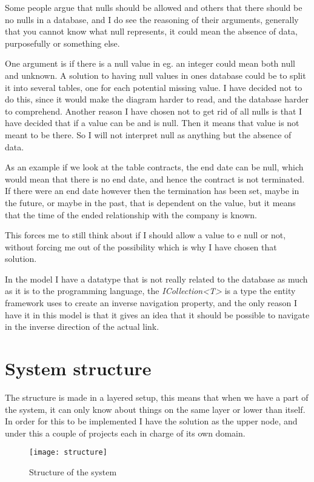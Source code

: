 Some people argue that nulls should be allowed and others that there should be no nulls in a database\cite{stackexchange:db:nullfields}, and I do see the reasoning of their arguments, generally that you cannot know what null represents, it could mean the absence of data, purposefully or something else.

One argument is if there is a null value in eg. an integer could mean both null and unknown. A solution to having null values in ones database could be to split it into several tables, one for each potential missing value. I have decided not to do this, since it would make the diagram harder to read, and the database harder to comprehend. Another reason I have chosen not to get rid of all nulls is that I have decided that if a value can be and is null. Then it means that value is not meant to be there. So I will not interpret null as anything but the absence of data.

As an example if we look at the table contracts, the end date can be null, which would mean that there is no end date, and hence the contract is not terminated. If there were an end date however then the termination has been set, maybe in the future, or maybe in the past, that is dependent on the value, but it means that the time of the ended relationship with the company is known.

This forces me to still think about if I should allow a value to e null or not, without forcing me out of the possibility which is why I have chosen that solution.

In the model I have a datatype that is not really related to the database as much as it is to the programming language, the \textit{ICollection<T>} is a type the entity framework uses to create an inverse navigation property, and the only reason I have it in this model is that it gives an idea that it should be possible to navigate in the inverse direction of the actual link.

\section{System structure}
\label{sec:System structure}
The structure is made in a layered setup, this means that when we have a part of the system, it can only know about things on the same layer or lower than itself. In order for this to be implemented I have the solution as the upper node, and under this a couple of projects each in charge of its own domain.

\begin{figure}[h]
  \centering
  \texttt{[image: structure]}
  \caption{Structure of the system}
  \label{fig:structure}
\end{figure}

